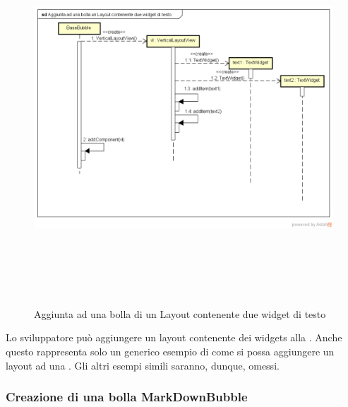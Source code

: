 \label{Aggiunta ad una bolla di un Layout contenente due widget di testo}
\begin{figure}[ht]
	\centering
	\includegraphics[width=16cm, height=14cm]{Sezioni/Diagrammi/img/Aggiunta ad una bolla un Layout contenente due widget di testo.png}
	\caption{Aggiunta ad una bolla di un Layout contenente due widget di testo}
	
\end{figure}
Lo sviluppatore può aggiungere un layout contenente dei widgets alla . Anche questo rappresenta solo un generico esempio di come si possa aggiungere un layout ad una . Gli altri esempi simili saranno, dunque, omessi. 

\newpage

\subsubsection{Creazione di una bolla MarkDownBubble}

